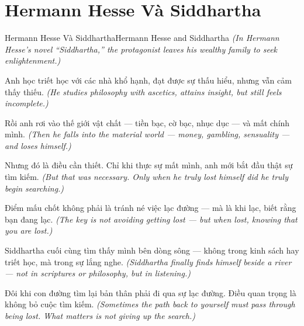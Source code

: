 \section{Hermann Hesse Và Siddhartha}
\begin{truyen}{Hermann Hesse Và Siddhartha}{Hermann Hesse and Siddhartha}
\textit{(In Hermann Hesse's novel ``Siddhartha,'' the protagonist leaves his wealthy family to seek enlightenment.)}

Anh học triết học với các nhà khổ hạnh, đạt được sự thấu hiểu, nhưng vẫn cảm thấy thiếu.
\textit{(He studies philosophy with ascetics, attains insight, but still feels incomplete.)}

Rồi anh rơi vào thế giới vật chất — tiền bạc, cờ bạc, nhục dục — và mất chính mình.
\textit{(Then he falls into the material world — money, gambling, sensuality — and loses himself.)}

Nhưng đó là điều cần thiết. Chỉ khi thực sự mất mình, anh mới bắt đầu thật sự tìm kiếm.
\textit{(But that was necessary. Only when he truly lost himself did he truly begin searching.)}

Điểm mấu chốt không phải là tránh né việc lạc đường — mà là khi lạc, biết rằng bạn đang lạc.
\textit{(The key is not avoiding getting lost — but when lost, knowing that you are lost.)}

Siddhartha cuối cùng tìm thấy mình bên dòng sông — không trong kinh sách hay triết học, mà trong sự lắng nghe.
\textit{(Siddhartha finally finds himself beside a river — not in scriptures or philosophy, but in listening.)}

\end{truyen}

\begin{baihoc}
Đôi khi con đường tìm lại bản thân phải đi qua sự lạc đường. Điều quan trọng là không bỏ cuộc tìm kiếm.
\textit{(Sometimes the path back to yourself must pass through being lost. What matters is not giving up the search.)}
\end{baihoc}
\ngancach

